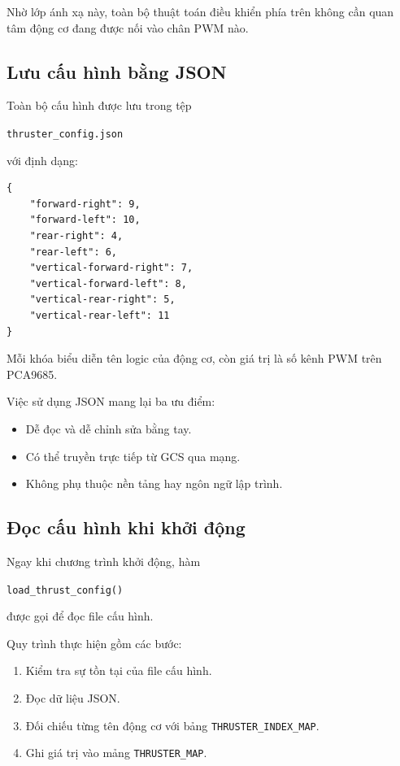 \documentclass[../DoAn.tex]{subfiles}
\begin{document}
Nhờ lớp ánh xạ này, toàn bộ thuật toán điều khiển phía trên không cần
quan tâm động cơ đang được nối vào chân PWM nào.

\subsection{Lưu cấu hình bằng JSON}

Toàn bộ cấu hình được lưu trong tệp

\begin{center}
\texttt{thruster\_config.json}
\end{center}

với định dạng:

\begin{verbatim}
{
    "forward-right": 9,
    "forward-left": 10,
    "rear-right": 4,
    "rear-left": 6,
    "vertical-forward-right": 7,
    "vertical-forward-left": 8,
    "vertical-rear-right": 5,
    "vertical-rear-left": 11
}
\end{verbatim}

Mỗi khóa biểu diễn tên logic của động cơ, còn giá trị là số kênh PWM
trên PCA9685.

Việc sử dụng JSON mang lại ba ưu điểm:

\begin{itemize}
    \item Dễ đọc và dễ chỉnh sửa bằng tay.
    \item Có thể truyền trực tiếp từ GCS qua mạng.
    \item Không phụ thuộc nền tảng hay ngôn ngữ lập trình.
\end{itemize}

\subsection{Đọc cấu hình khi khởi động}

Ngay khi chương trình khởi động, hàm

\begin{center}
\texttt{load\_thrust\_config()}
\end{center}

được gọi để đọc file cấu hình.

Quy trình thực hiện gồm các bước:

\begin{enumerate}
    \item Kiểm tra sự tồn tại của file cấu hình.
    \item Đọc dữ liệu JSON.
    \item Đối chiếu từng tên động cơ với bảng
    \texttt{THRUSTER\_INDEX\_MAP}.
    \item Ghi giá trị vào mảng
    \texttt{THRUSTER\_MAP}.
\end{enumerate}
\end{document}
